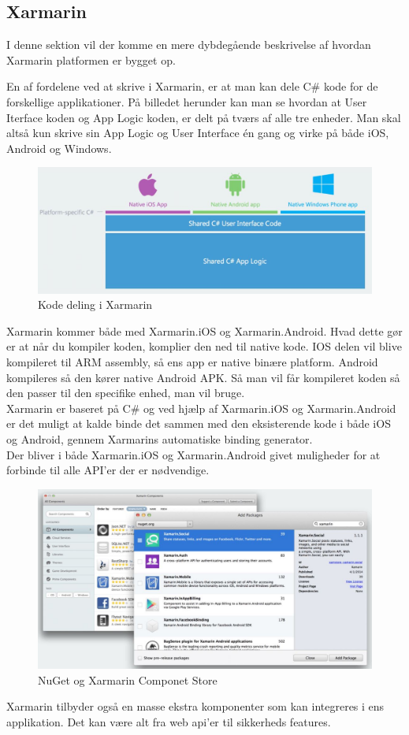 \subsection{Xarmarin}
I denne sektion vil der komme en mere dybdegående beskrivelse af hvordan Xarmarin platformen er bygget op.

En af fordelene ved at skrive i Xarmarin, er at man kan dele C\# kode for de forskellige applikationer.
På billedet herunder kan man se hvordan at User Iterface koden og App Logic koden, er delt på tværs af alle tre enheder. Man skal altså kun skrive sin App Logic og User Interface én gang og virke på både iOS, Android og Windows.
\begin{figure}[H]
	\centering
	\includegraphics[width=1\linewidth]{Applikation/XarmarinShare.JPG}
	\caption{Kode deling i Xarmarin}
	\label{fig:CodeShare}
\end{figure}

\clearpage

Xarmarin kommer både med Xarmarin.iOS og Xarmarin.Android. Hvad dette gør er at når du kompiler koden, komplier den ned til native kode. IOS delen vil blive kompileret til ARM assembly, så ens app er native binære platform. Android kompileres så den kører native Android APK. Så man vil får kompileret koden så den passer til den specifike enhed, man vil bruge. \\
Xarmarin er baseret på C\# og ved hjælp af Xarmarin.iOS og Xarmarin.Android er det muligt at kalde binde det sammen med den eksisterende kode i både iOS og Android, gennem Xarmarins automatiske binding generator. \\
Der bliver i både Xarmarin.iOS og Xarmarin.Android givet muligheder for at forbinde til alle API'er der er nødvendige. \\

\begin{figure}[H]
	\centering
	\includegraphics[width=0.7\linewidth]{Applikation/NuGet.JPG}
	\caption{NuGet og Xarmarin Componet Store}
	\label{fig:NuGet}
\end{figure}
Xarmarin tilbyder også en masse ekstra komponenter som kan integreres i ens applikation. Det kan være alt fra web api'er til sikkerheds features.

\clearpage